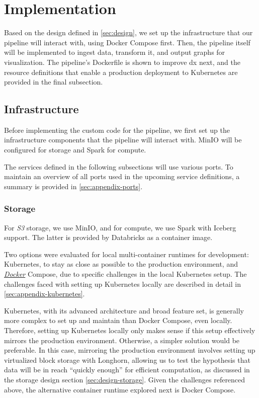\section{Implementation}
\label{sec:implementation}

Based on the design defined in \cref{sec:design}, we set up the infrastructure that our pipeline will interact with, using Docker Compose first.
Then, the pipeline itself will be implemented to ingest data, transform it, and output graphs for visualization.
The pipeline's Dockerfile is shown to improve \ac{dx} next, and the resource definitions that enable a production deployment to Kubernetes are provided in the final subsection.

\subsection{Infrastructure}
\label{sec:implementation-infrastructure}

Before implementing the custom code for the pipeline, we first set up the infrastructure components that the pipeline will interact with.
MinIO will be configured for storage and Spark for compute.

The services defined in the following subsections will use various ports.
To maintain an overview of all ports used in the upcoming service definitions, a summary is provided in \cref{sec:appendix-ports}.

\subsubsection{Storage}
\label{sec:implementation-infrastructure-storage}

For \textit{S3} storage, we use MinIO, and for compute, we use Spark with Iceberg support.
The latter is provided by Databricks as a container image.

Two options were evaluated for local multi-container runtimes for development: Kubernetes, to stay as close as possible to the production environment, and \href{https://www.docker.com/}{\textit{Docker}} Compose, due to specific challenges in the local Kubernetes setup.
The challenges faced with setting up Kubernetes locally are described in detail in \cref{sec:appendix-kubernetes}.

Kubernetes, with its advanced architecture and broad feature set, is generally more complex to set up and maintain than Docker Compose, even locally.
Therefore, setting up Kubernetes locally only makes sense if this setup effectively mirrors the production environment.
Otherwise, a simpler solution would be preferable.
In this case, mirroring the production environment involves setting up virtualized block storage with Longhorn, allowing us to test the hypothesis that data will be in reach ``quickly enough'' for efficient computation, as discussed in the storage design section \cref{sec:design-storage}.
Given the challenges referenced above, the alternative container runtime explored next is Docker Compose.


